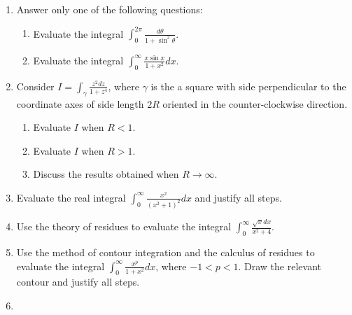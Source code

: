 \documentclass[a4paper,10pt]{article}
\begin{document}
\begin{enumerate}
	
	
\item 
	
	Answer only one of the following questions:
	\begin{enumerate}
	\item Evaluate the integral $\int_{0}^{2\pi}\frac{d\theta}{1+\sin^{2}\theta}$.
	
	\item Evaluate the integral $\int_{0}^{\infty}\frac{x \sin x}{1+x^{2}}dx$.
	\end{enumerate}
	
\item
	Consider $I = \int_{\gamma}\frac{z^{2}dz}{1+z^{4}}$, where $\gamma$ is the a square with side perpendicular to the coordinate axes of side length $2R$ oriented in the counter-clockwise direction.
	\begin{enumerate}
	\item Evaluate $I$ when $R < 1$.
	\item  Evaluate $I$ when $R > 1$.
	\item  Discuss the results obtained when $R \rightarrow \infty$.
	\end{enumerate}
	
\iffalse \item 
	Choose a branch of $\sqrt{z^{2}-1}$ that is analytic on $\mathbb{C} \backslash \{z + 0i \mid -1 \leq z \leq 1\}$ and has the value $\sqrt{3}$ at $z = 2$. Evaluate $\int_{\gamma}\sqrt{z^{2}-1}dz$, where $\gamma$ is a contour (not specified).
	
\fi
	
	\item 
	
	Evaluate the real integral $\int_{0}^{\infty}\frac{x^{2}}{(x^{2}+1)^{2}}dx$ and justify all steps.
	
	\item 
	
	Use the theory of residues to evaluate the integral $\int_{0}^{\infty}\frac{\sqrt{x}dx}{x^{2}+4}$.
	
	\item 
	
	Use the method of contour integration and the calculus of residues to evaluate the integral $\int_{0}^{\infty}\frac{x^{p}}{1+x^{2}}dx$, where $-1 < p < 1$. Draw the relevant contour and justify all steps.
	
	\item 
	

\end{enumerate}
\end{document}

